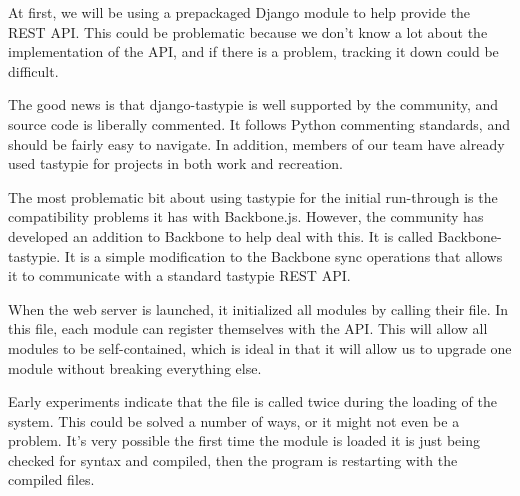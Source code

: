 At first, we will be using a prepackaged Django module to help provide the REST API.
This could be problematic because we don't know a lot about the implementation of the API, and if there is a problem, tracking it down could be difficult.

The good news is that django-tastypie is well supported by the community, and source code is liberally commented.
It follows Python commenting standards, and should be fairly easy to navigate.
In addition, members of our team have already used tastypie for projects in both work and recreation.

The most problematic bit about using tastypie for the initial run-through is the compatibility problems it has with Backbone.js.
However, the community has developed an addition to Backbone to help deal with this.
It is called Backbone-tastypie.
It is a simple modification to the Backbone sync operations that allows it to communicate with a standard tastypie REST API.

When the web server is launched, it initialized all modules by calling their  file.
In this file, each module can register themselves with the API.
This will allow all modules to be self-contained, which is ideal in that it will allow us to upgrade one module without breaking everything else.

Early experiments indicate that the  file is called twice during the loading of the system.
This could be solved a number of ways, or it might not even be a problem. 
It's very possible the first time the module is loaded it is just being checked for syntax and compiled, then the program is restarting with the compiled files.
